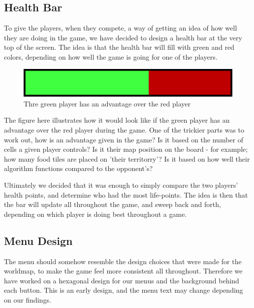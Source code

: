 \subsection{Health Bar}
To give the players, when they compete, a way of getting an idea of how well they are doing in the game, we have decided to design a health bar at the very top of the screen. 
The idea is that the health bar will fill with green and red colors, depending on how well the game is going for one of the players.

\begin{figure}[h]
	\centering
		\includegraphics{img/healthbar_example.png}
	\caption{Thre green player has an advantage over the red player}
	\label{fig:healthbar}
\end{figure}

The figure here illustrates how it would look like if the green player has an advantage over the red player during the game.
One of the trickier parts was to work out, how is an advantage given in the game?
Is it based on the number of cells a given player controls?
Is it their map position on the board - for example; how many food tiles are placed on 'their territorry'?
Is it based on how well their algorithm functions compared to the opponent's?\newline

Ultimately we decided that it was enough to simply compare the two players' health points, and determine who had the most life-points.
The idea is then that the bar will update all throughout the game, and sweep back and forth, depending on which player is doing best throughout a game.

\subsection{Menu Design}
The menu should somehow resemble the design choices that were made for the worldmap, to make the game feel more consistent all throughout.
Therefore we have worked on a hexagonal design for our menus and the background behind each button.
This is an early design, and the menu text may change depending on our findings.\newline

